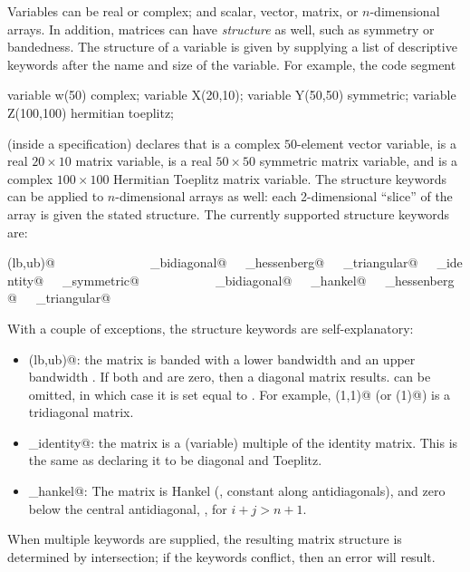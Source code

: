 \documentclass[12pt]{article}
\begin{document}
Variables can be real or complex; and scalar, vector,
matrix, or $n$-dimensional arrays. In addition, matrices can have \emph{structure}
as well, such as symmetry or bandedness. The structure of a variable
is given by supplying a list of descriptive keywords after the name
and size of the variable.
For example, the code segment
\begin{code}
	variable w(50) complex;
	variable X(20,10);
	variable Y(50,50) symmetric;
	variable Z(100,100) hermitian toeplitz;
\end{code}
(inside a \cvx specification) declares that \verb@w@ is a complex
$50$-element vector variable, \verb@X@ is
a real $20 \times 10$ matrix variable, \verb@Y@ is
a real $50 \times 50$ symmetric matrix variable,
and \verb@Z@ is a complex $100 \times 100$ Hermitian Toeplitz 
matrix variable.
The structure keywords can be applied to
$n$-dimensional arrays as well:
each 2-dimensional ``slice'' of the array
is given the stated structure.  The currently supported structure
keywords are:
\begin{center}
\verb@banded(lb,ub)@\ \ \ \verb@complex@\ \ \ \verb@diagonal@\ \ \ \verb@hankel@\ \ \ \verb@hermitian@\ \ \ 
\verb@lower_bidiagonal@\ \ \ \verb@lower_hessenberg@\ \ \ \verb@lower_triangular@\ \ \ \verb@scaled_identity@\ \ \ 
\verb@skew_symmetric@\ \ \ \verb@symmetric@\ \ \ \verb@toeplitz@\ \ \ \verb@tridiagonal@\ \ \ 
\verb@upper_bidiagonal@\ \ \ \verb@upper_hankel@\ \ \ \verb@upper_hessenberg@\ \ \ \verb@upper_triangular@\ \ \ 
\end{center}
With a couple of exceptions, the structure keywords are self-explanatory:
\begin{itemize}
\item \verb@banded(lb,ub)@: the matrix is banded with a lower bandwidth \verb@lb@
and an upper bandwidth \verb@ub@. If both \verb@lb@ and \verb@ub@ are zero, then a 
diagonal matrix results. \verb@ub@ can be omitted, in which case it is set equal to \verb@lb@.
For example, \verb@banded(1,1)@ (or \verb@banded(1)@) is a tridiagonal matrix.
\item \verb@scaled_identity@: the matrix is a (variable) multiple of 
the identity matrix.
This is the same as declaring it to be diagonal and Toeplitz.
\item \verb@upper_hankel@: The matrix is Hankel (\ie, constant along antidiagonals), and zero
below the central antidiagonal, \ie, for $i+j>n+1$.
\end{itemize}
When multiple keywords are supplied, the resulting matrix structure is
determined by intersection; if the keywords conflict, then an error will result.
\end{document}
